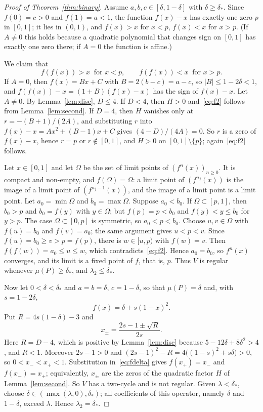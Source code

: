 \documentclass[11pt]{amsart}
\theoremstyle{definition}
\theoremstyle{remark}
\begin{document}
\begin{proof}[Proof of Theorem~\ref{thm:binary}]
Assume $a,b,c\in[\delta,1-\delta]$ with $\delta\ge\delta_*$. Since $f(0)=c>0$ and $f(1)=a<1$, the function $f(x)-x$ has
exactly one zero $p$ in $[0,1]$; it lies in $(0,1)$, and $f(x)>x$ for $x<p$, $f(x)<x$ for $x>p$. (If $A\ne0$ this holds
because a quadratic polynomial that changes sign on $[0,1]$ has exactly one zero there; if $A=0$ the function is
affine.)

We claim that
\begin{equation}\label{eq:f2}
f(f(x))>x\ \text{ for } x<p,\qquad f(f(x))<x\ \text{ for } x>p .
\end{equation}
If $A=0$, then $f(x)=Bx+C$ with $B=2(b-c)=a-c$, so $|B|\le1-2\delta<1$, and $f(f(x))-x=(1+B)(f(x)-x)$ has the sign of $f(x)-x$. Let $A\ne0$. By
Lemma~\ref{lem:disc}, $D\le4$. If $D<4$, then $H>0$ and~\eqref{eq:f2} follows from Lemma~\ref{lem:second}. If $D=4$,
then $H$ vanishes only at $r=-(B+1)/(2A)$, and substituting $r$ into $f(x)-x=Ax^2+(B-1)x+C$ gives $(4-D)/(4A)=0$.
So $r$ is a zero of $f(x)-x$, hence $r=p$ or $r\notin[0,1]$, and $H>0$ on $[0,1]\setminus\{p\}$; again~\eqref{eq:f2}
follows.

Let $x\in[0,1]$ and let $\Omega$ be the set of limit points of $(f^n(x))_{n\ge0}$. It is compact and non-empty, and
$f(\Omega)=\Omega$: a limit point of $(f^{n_j}(x))$ is the image of a limit point of $(f^{n_j-1}(x))$, and the image of
a limit point is a limit point. Let $a_0=\min\Omega$ and $b_0=\max\Omega$. Suppose $a_0<b_0$. If $\Omega\subset[p,1]$,
then $b_0>p$ and $b_0=f(y)$ with $y\in\Omega$; but $f(p)=p<b_0$ and $f(y)<y\le b_0$ for $y>p$. The case
$\Omega\subset[0,p]$ is symmetric, so $a_0<p<b_0$. Choose $u,v\in\Omega$ with $f(u)=b_0$ and $f(v)=a_0$; the same
argument gives $u<p<v$. Since $f(u)=b_0\ge v>p=f(p)$, there is $w\in[u,p)$ with $f(w)=v$. Then
$f(f(w))=a_0\le u\le w$, which contradicts~\eqref{eq:f2}. Hence $a_0=b_0$, so $f^n(x)$ converges, and its limit is a
fixed point of $f$, that is, $p$. Thus $V$ is regular whenever $\mu(P)\ge\delta_*$, and $\lambda_2\le\delta_*$.

Now let $0<\delta<\delta_*$ and $a=b=\delta$, $c=1-\delta$, so that $\mu(P)=\delta$ and, with $s=1-2\delta$,
\begin{equation}\label{eq:fdelta}
f(x)=\delta+s(1-x)^2 .
\end{equation}
Put $R=4s(1-\delta)-3$ and
\[
x_\pm=\frac{2s-1\pm\sqrt R}{2s}.
\]
Here $R=D-4$, which is positive by Lemma~\ref{lem:disc} because $5-12\delta+8\delta^2>4$, and $R<1$. Moreover $2s-1>0$
and $(2s-1)^2-R=4\bigl((1-s)^2+s\delta\bigr)>0$, so $0<x_-<x_+<1$. Substitution in~\eqref{eq:fdelta} gives
$f(x_+)=x_-$ and $f(x_-)=x_+$; equivalently, $x_\pm$ are the zeros of the quadratic factor $H$ of
Lemma~\ref{lem:second}. So $V$ has a two-cycle and is not regular. Given $\lambda<\delta_*$, choose
$\delta\in(\max(\lambda,0),\delta_*)$; all coefficients of this operator, namely $\delta$ and $1-\delta$, exceed
$\lambda$. Hence $\lambda_2=\delta_*$.
\end{proof}
\end{document}
